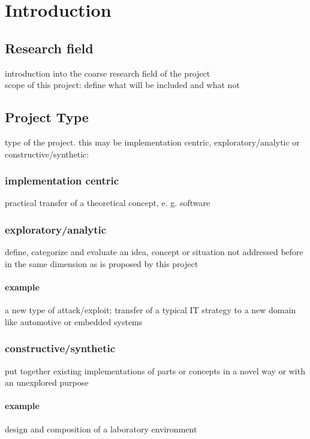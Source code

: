 \chapter{Introduction}
\label{chp:introduction}

\section{Research field}\label{sec:field}

\begin{shaded}
\noindent
introduction into the coarse research field of the project \\
scope of this project: define what will be included and what not
\end{shaded}

\section{Project Type}\label{sec:type}

\begin{shaded}
\noindent
type of the project. this may be implementation centric, exploratory/analytic or constructive/synthetic:

\subsection{implementation centric}
practical transfer of a theoretical concept, e. g. software

\bigskip
\subsection{exploratory/analytic}
define, categorize and evaluate an idea, concept or situation not addressed before in the same dimension as is proposed by this project
\subsubsection{example}
a new type of attack/exploit; transfer of a typical IT strategy to a new domain like automotive or embedded systems

\bigskip
\subsection {constructive/synthetic}
put together existing implementations of parts or concepts in a novel way or with an unexplored purpose
\subsubsection{example}
design and composition of a laboratory environment

\end{shaded}

\vfill



\lipsum[2-7]
